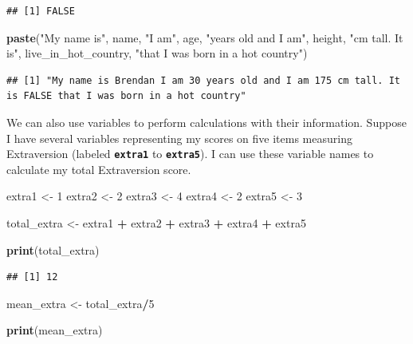 \documentclass[
]{book}
\newenvironment{Shaded}{\begin{snugshade}}{\end{snugshade}}
\newcommand{\DecValTok}[1]{\textcolor[rgb]{0.00,0.00,0.81}{#1}}
\newcommand{\FunctionTok}[1]{\textcolor[rgb]{0.13,0.29,0.53}{\textbf{#1}}}
\newcommand{\NormalTok}[1]{#1}
\newcommand{\OtherTok}[1]{\textcolor[rgb]{0.56,0.35,0.01}{#1}}
\newcommand{\SpecialCharTok}[1]{\textcolor[rgb]{0.81,0.36,0.00}{\textbf{#1}}}
\newcommand{\StringTok}[1]{\textcolor[rgb]{0.31,0.60,0.02}{#1}}
\begin{document}
\begin{verbatim}
## [1] FALSE
\end{verbatim}

\begin{Shaded}
\begin{Highlighting}[]
\FunctionTok{paste}\NormalTok{(}\StringTok{"My name is"}\NormalTok{, name, }\StringTok{"I am"}\NormalTok{, age, }\StringTok{"years old and I am"}\NormalTok{, height, }\StringTok{"cm tall. It is"}\NormalTok{, live\_in\_hot\_country, }\StringTok{"that I was born in a hot country"}\NormalTok{)}
\end{Highlighting}
\end{Shaded}

\begin{verbatim}
## [1] "My name is Brendan I am 30 years old and I am 175 cm tall. It is FALSE that I was born in a hot country"
\end{verbatim}

We can also use variables to perform calculations with their information. Suppose I have several variables representing my scores on five items measuring Extraversion (labeled \textbf{\texttt{extra1}} to \textbf{\texttt{extra5}}). I can use these variable names to calculate my total Extraversion score.

\begin{Shaded}
\begin{Highlighting}[]
\NormalTok{extra1 }\OtherTok{\textless{}{-}} \DecValTok{1}
\NormalTok{extra2 }\OtherTok{\textless{}{-}} \DecValTok{2}
\NormalTok{extra3 }\OtherTok{\textless{}{-}} \DecValTok{4}
\NormalTok{extra4 }\OtherTok{\textless{}{-}} \DecValTok{2}
\NormalTok{extra5 }\OtherTok{\textless{}{-}} \DecValTok{3}

\NormalTok{total\_extra }\OtherTok{\textless{}{-}}\NormalTok{ extra1 }\SpecialCharTok{+}\NormalTok{ extra2 }\SpecialCharTok{+}\NormalTok{ extra3 }\SpecialCharTok{+}\NormalTok{ extra4 }\SpecialCharTok{+}\NormalTok{ extra5}

\FunctionTok{print}\NormalTok{(total\_extra)}
\end{Highlighting}
\end{Shaded}

\begin{verbatim}
## [1] 12
\end{verbatim}

\begin{Shaded}
\begin{Highlighting}[]
\NormalTok{mean\_extra }\OtherTok{\textless{}{-}}\NormalTok{  total\_extra}\SpecialCharTok{/}\DecValTok{5}

\FunctionTok{print}\NormalTok{(mean\_extra)}
\end{Highlighting}
\end{Shaded}
\end{document}
